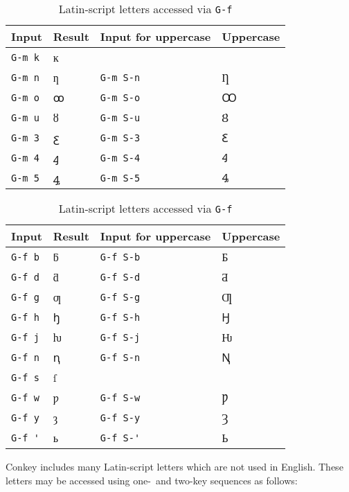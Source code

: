 \documentclass[oneside]{memoir}
\newcommand{\key}{\verb}
\begin{document}
\begin{table}
\begin{minipage}{0.4\linewidth}
\centering
\cprotect\caption{Latin-script letters accessed via \key|G-m|}
\label{tab:letters_g-m}
\begin{tabular}{llll}
\toprule
Input & Result & Input for uppercase & Uppercase \\
\midrule
\key|G-m k| & ĸ &               &  \\
\key|G-m n| & ƞ & \key|G-m S-n| & Ƞ \\
\key|G-m o| & ꝏ & \key|G-m S-o| & Ꝏ \\
\key|G-m u| & ȣ & \key|G-m S-u| & Ȣ \\
\key|G-m 3| & ꜫ & \key|G-m S-3| & Ꜫ \\
\key|G-m 4| & ꜭ & \key|G-m S-4| & Ꜭ \\
\key|G-m 5| & ꜯ & \key|G-m S-5| & Ꜯ \\
\bottomrule
\end{tabular}
\end{minipage}\hfill
\begin{minipage}{0.4\linewidth}
\centering
\cprotect\caption{Latin-script letters accessed via \key|G-f|}
\label{tab:letters_g-f}
\begin{tabular}{llll}
\toprule
Input & Result & Input for uppercase & Uppercase \\
\midrule
\key|G-f b| & ƃ & \key|G-f S-b| & Ƃ \\
\key|G-f d| & ƌ & \key|G-f S-d| & Ƌ \\
\key|G-f g| & ƣ & \key|G-f S-g| & Ƣ \\
\key|G-f h| & ꜧ & \key|G-f S-h| & Ꜧ \\
\key|G-f j| & ƕ & \key|G-f S-j| & Ƕ \\
\key|G-f n| & ꞑ & \key|G-f S-n| & Ꞑ \\
\key|G-f s| & ſ &               &  \\
\key|G-f w| & ƿ & \key|G-f S-w| & Ƿ \\
\key|G-f y| & ȝ & \key|G-f S-y| & Ȝ \\
\key|G-f '| & ь & \key|G-f S-'| & Ь \\
\bottomrule
\end{tabular}
\end{minipage}
\end{table}

Conkey includes many Latin-script letters which are not used in English.
These letters may be accessed using one-~and two-key sequences as follows:
\end{document}
